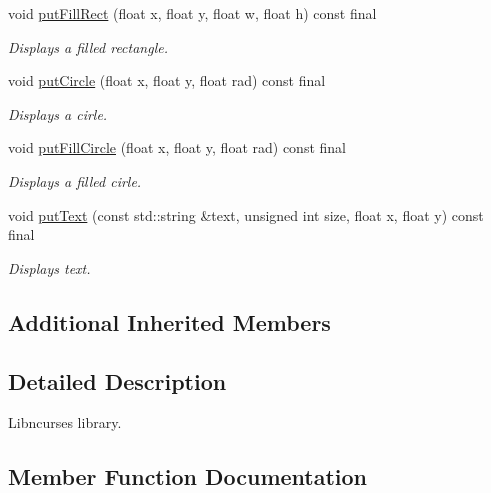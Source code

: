 \begin{DoxyCompactItemize}
void \mbox{\hyperlink{classArcade_1_1Display_1_1Ncurses_a2f7e633e73799babda0a380a21b54abf}{put\+Fill\+Rect}} (float x, float y, float w, float h) const final
\begin{DoxyCompactList}\small\item\em Displays a filled rectangle. \end{DoxyCompactList}\item 
void \mbox{\hyperlink{classArcade_1_1Display_1_1Ncurses_a06da271e2ab3e6e188965471ce46bf32}{put\+Circle}} (float x, float y, float rad) const final
\begin{DoxyCompactList}\small\item\em Displays a cirle. \end{DoxyCompactList}\item 
void \mbox{\hyperlink{classArcade_1_1Display_1_1Ncurses_a2c97706223722017dc61ac12105c9d81}{put\+Fill\+Circle}} (float x, float y, float rad) const final
\begin{DoxyCompactList}\small\item\em Displays a filled cirle. \end{DoxyCompactList}\item 
void \mbox{\hyperlink{classArcade_1_1Display_1_1Ncurses_af660e53523f4d13cc33612ac94c7da97}{put\+Text}} (const std\+::string \&text, unsigned int size, float x, float y) const final
\begin{DoxyCompactList}\small\item\em Displays text. \end{DoxyCompactList}\end{DoxyCompactItemize}
\subsection*{Additional Inherited Members}


\subsection{Detailed Description}
Libncurses library. 

\subsection{Member Function Documentation}
\mbox{\label{classArcade_1_1Display_1_1Ncurses_a16855687c9b3545739f2b65f0d72e86a}} 
